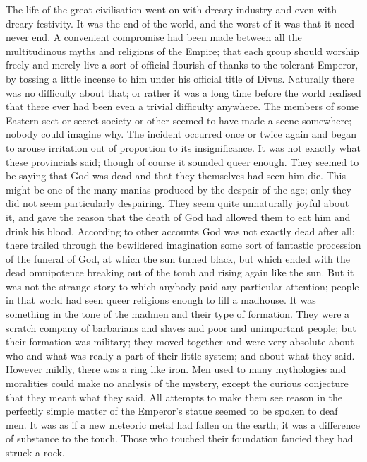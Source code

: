 The life of the great civilisation went on with dreary industry and even with dreary festivity. It was the end of the world, and the worst of it was that it need never end. A convenient compromise had been made between all the multitudinous myths and religions of the Empire; that each group should worship freely and merely live a sort of official flourish of thanks to the tolerant Emperor, by tossing a little incense to him under his official title of Divus. Naturally there was no difficulty about that; or rather it was a long time before the world realised that there ever had been even a trivial difficulty anywhere. The members of some Eastern sect or secret society or other seemed to have made a scene somewhere; nobody could imagine why. The incident occurred once or twice again and began to arouse irritation out of proportion to its insignificance. It was not exactly what these provincials said; though of course it sounded queer enough. They seemed to be saying that God was dead and that they themselves had seen him die. This might be one of the many manias produced by the despair of the age; only they did not seem particularly despairing. They seem quite unnaturally joyful about it, and gave the reason that the death of God had allowed them to eat him and drink his blood. According to other accounts God was not exactly dead after all; there trailed through the bewildered imagination some sort of fantastic procession of the funeral of God, at which the sun turned black, but which ended with the dead omnipotence breaking out of the tomb and rising again like the sun. But it was not the strange story to which anybody paid any particular attention; people in that world had seen queer religions enough to fill a madhouse. It was something in the tone of the madmen and their type of formation. They were a scratch company of barbarians and slaves and poor and unimportant people; but their formation was military; they moved together and were very absolute about who and what was really a part of their little system; and about what they said. However mildly, there was a ring like iron. Men used to many mythologies and moralities could make no analysis of the mystery, except the curious conjecture that they meant what they said. All attempts to make them see reason in the perfectly simple matter of the Emperor's statue seemed to be spoken to deaf men. It was as if a new meteoric metal had fallen on the earth; it was a difference of substance to the touch. Those who touched their foundation fancied they had struck a rock.

